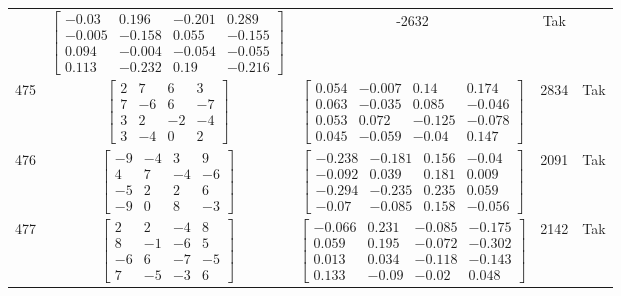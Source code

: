 \documentclass[a4paper,12pt]{article}
\begin{document}
\begin{tabular}{c c c c c}
&
$\begin{bmatrix} -0.03 & 0.196 & -0.201 & 0.289 \\ -0.005 & -0.158 & 0.055 & -0.155 \\ 0.094 & -0.004 & -0.054 & -0.055 \\ 0.113 & -0.232 & 0.19 & -0.216 \end{bmatrix}$
&
-2632
&
Tak
\\
475
&
$\begin{bmatrix} 2 & 7 & 6 & 3 \\ 7 & -6 & 6 & -7 \\ 3 & 2 & -2 & -4 \\ 3 & -4 & 0 & 2 \end{bmatrix}$
&
$\begin{bmatrix} 0.054 & -0.007 & 0.14 & 0.174 \\ 0.063 & -0.035 & 0.085 & -0.046 \\ 0.053 & 0.072 & -0.125 & -0.078 \\ 0.045 & -0.059 & -0.04 & 0.147 \end{bmatrix}$
&
2834
&
Tak
\\
476
&
$\begin{bmatrix} -9 & -4 & 3 & 9 \\ 4 & 7 & -4 & -6 \\ -5 & 2 & 2 & 6 \\ -9 & 0 & 8 & -3 \end{bmatrix}$
&
$\begin{bmatrix} -0.238 & -0.181 & 0.156 & -0.04 \\ -0.092 & 0.039 & 0.181 & 0.009 \\ -0.294 & -0.235 & 0.235 & 0.059 \\ -0.07 & -0.085 & 0.158 & -0.056 \end{bmatrix}$
&
2091
&
Tak
\\
477
&
$\begin{bmatrix} 2 & 2 & -4 & 8 \\ 8 & -1 & -6 & 5 \\ -6 & 6 & -7 & -5 \\ 7 & -5 & -3 & 6 \end{bmatrix}$
&
$\begin{bmatrix} -0.066 & 0.231 & -0.085 & -0.175 \\ 0.059 & 0.195 & -0.072 & -0.302 \\ 0.013 & 0.034 & -0.118 & -0.143 \\ 0.133 & -0.09 & -0.02 & 0.048 \end{bmatrix}$
&
2142
&
Tak
\\

\end{tabular}
\end{document}
